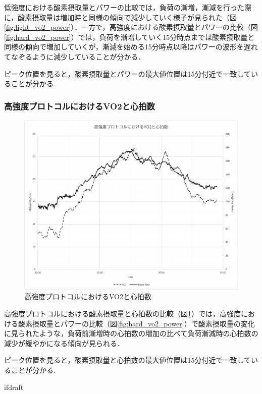 低強度における酸素摂取量とパワーの比較では，負荷の漸増，漸減を行った際に，酸素摂取量は増加時と同様の傾向で減少していく様子が見られた（図\ref{fig:light_vo2_power}）．一方で，高強度における酸素摂取量とパワーの比較（図\ref{fig:hard_vo2_power}）では，負荷を漸増していく15分時点までは酸素摂取量と同様の傾向で増加していくが，漸減を始める15分時点以降はパワーの波形を遅れてなぞるように減少していることが分かる．

ピーク位置を見ると，酸素摂取量とパワーの最大値位置は15分付近で一致していることが分かる.

\subsubsection{高強度プロトコルにおけるVO2と心拍数}

\begin{figure}[H]
  \begin{center}
    \includegraphics[width=12cm]{fig/hard_vo2_hr}
    \caption{高強度プロトコルにおけるVO2と心拍数}
    \label{fig:hard_vo2_hr}
  \end{center}
\end{figure}

高強度プロトコルにおける酸素摂取量と心拍数の比較（図\ref{fig:hard_vo2_hr}）では，高強度における酸素摂取量とパワーの比較（図\ref{fig:hard_vo2_power}）で酸素摂取量の変化に見られたような，負荷前漸増時の心拍数の増加の比べて負荷漸減時の心拍数の減少が緩やかになる傾向が見られる．

ピーク位置を見ると，酸素摂取量と心拍数の最大値位置は15分付近で一致していることが分かる.

\expandafter\ifx\csname ifdraft\endcsname\relax
  
\fi
